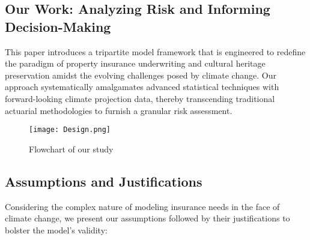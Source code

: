 \documentclass{mcmthesis}
\begin{document}
\subsection{Our Work: Analyzing Risk and Informing Decision-Making}
This paper introduces a tripartite model framework that is engineered to redefine the paradigm of property insurance underwriting and cultural heritage preservation amidst the evolving challenges posed by climate change. Our approach systematically amalgamates advanced statistical techniques with forward-looking climate projection data, thereby transcending traditional actuarial methodologies to furnish a granular risk assessment.

\begin{figure}[h]
    \centering
    \texttt{[image: Design.png]}
    \caption{Flowchart of our study}
    \label{fig:SystemDesign}
\end{figure}

\subsection{Assumptions and Justifications}

Considering the complex nature of modeling insurance needs in the face of climate change, we present our assumptions followed by their justifications to bolster the model's validity:
\end{document}

